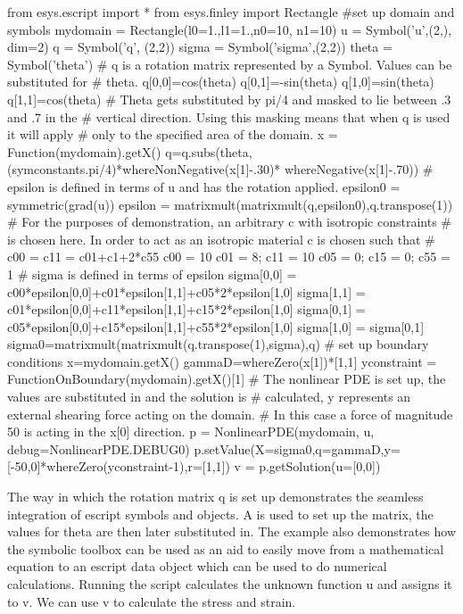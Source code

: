 \begin{python}
from esys.escript import *
from esys.finley import Rectangle
#set up domain and symbols
mydomain = Rectangle(l0=1.,l1=1.,n0=10, n1=10)
u = Symbol('u',(2,), dim=2)
q = Symbol('q', (2,2))
sigma = Symbol('sigma',(2,2))
theta = Symbol('theta')
# q is a rotation matrix represented by a Symbol. Values can be substituted for 
# theta.
q[0,0]=cos(theta)
q[0,1]=-sin(theta)
q[1,0]=sin(theta)
q[1,1]=cos(theta)
# Theta gets substituted by pi/4 and masked to lie between .3 and .7 in the 
# vertical direction. Using this masking means that when q is used it will apply
# only to the specified area of the domain. 
x = Function(mydomain).getX()
q=q.subs(theta,(symconstants.pi/4)*whereNonNegative(x[1]-.30)*
    whereNegative(x[1]-.70))
# epsilon is defined in terms of u and has the rotation applied. 
epsilon0 = symmetric(grad(u))
epsilon = matrixmult(matrixmult(q,epsilon0),q.transpose(1))
# For the purposes of demonstration, an arbitrary c with isotropic constraints 
# is chosen here. In order to act as an isotropic material c is chosen such that 
# c00 = c11 = c01+c1+2*c55
c00 = 10
c01 = 8; c11 = 10
c05 = 0; c15 = 0; c55 = 1
# sigma is defined in terms of epsilon
sigma[0,0] = c00*epsilon[0,0]+c01*epsilon[1,1]+c05*2*epsilon[1,0]
sigma[1,1] = c01*epsilon[0,0]+c11*epsilon[1,1]+c15*2*epsilon[1,0]
sigma[0,1] = c05*epsilon[0,0]+c15*epsilon[1,1]+c55*2*epsilon[1,0]
sigma[1,0] = sigma[0,1]
sigma0=matrixmult(matrixmult(q.transpose(1),sigma),q)
# set up boundary conditions
x=mydomain.getX()
gammaD=whereZero(x[1])*[1,1]
yconstraint = FunctionOnBoundary(mydomain).getX()[1]
# The nonlinear PDE is set up, the values are substituted in and the solution is
# calculated, y represents an external shearing force acting on the domain. 
# In this case a force of magnitude 50 is acting in the x[0] direction.
p = NonlinearPDE(mydomain, u, debug=NonlinearPDE.DEBUG0)
p.setValue(X=sigma0,q=gammaD,y=[-50,0]*whereZero(yconstraint-1),r=[1,1])
v = p.getSolution(u=[0,0])
\end{python}
The way in which the rotation matrix q is set up demonstrates the seamless integration of escript symbols and \Data objects. A \SYMBOL is used to set up the matrix, the values for theta are then later substituted in. The example also demonstrates how the symbolic toolbox can be used as an aid to easily move from a mathematical equation to an escript data object which can be used to do numerical calculations. 
Running the script calculates the unknown function u and assigns it to v. We can use v to calculate the stress and strain.  

